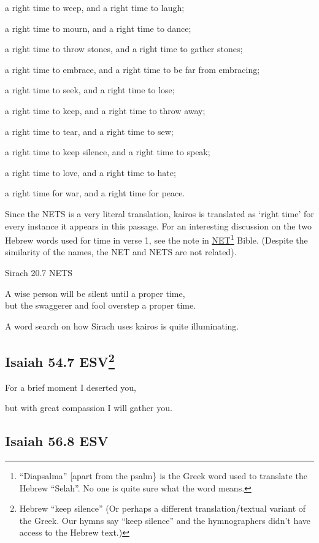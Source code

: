 \documentclass[
]{article}
\begin{document}
a right time to weep, and a right time to laugh;

a right time to mourn, and a right time to dance;

a right time to throw stones, and a right time to gather stones;

a right time to embrace, and a right time to be far from embracing;

a right time to seek, and a right time to lose;

a right time to keep, and a right time to throw away;

a right time to tear, and a right time to sew;

a right time to keep silence, and a right time to speak;

a right time to love, and a right time to hate;

a right time for war, and a right time for peace.

Since the NETS is a very literal translation, kairos is translated as
`right time' for every instance it appears in this passage. For an
interesting discussion on the two Hebrew words used for time in verse 1,
see the note in
\href{https://netbible.org/bible/Ecclesiastes+3}{\ul{NET}}\footnote{``Diapsalma''
  {[}apart from the psalm\} is the Greek word used to translate the
  Hebrew ``Selah''. No one is quite sure what the word means.} Bible.
(Despite the similarity of the names, the NET and NETS are not related).

Sirach 20.7 NETS

A wise person will be silent until a proper time,\\
but the swaggerer and fool overstep a proper time.

A word search on how Sirach uses kairos is quite illuminating.

\subsection[Isaiah 54.7 ESV]{\texorpdfstring{Isaiah 54.7
ESV\footnote{Hebrew ``keep silence'' (Or perhaps a different
  translation/textual variant of the Greek. Our hymns say ``keep
  silence'' and the hymnographers didn't have access to the Hebrew
  text.)}}{Isaiah 54.7 ESV}}\label{isaiah-54.7-esv4}

For a brief moment I deserted you,

but with great compassion I will gather you.

\subsection{Isaiah 56.8 ESV}\label{isaiah-56.8-esv}
\end{document}
